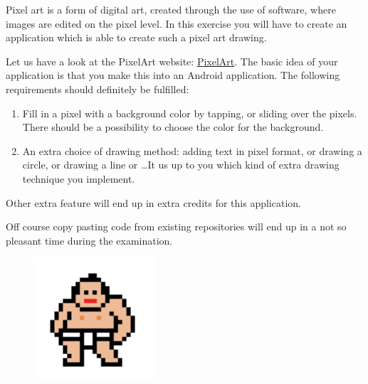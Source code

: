 \begin{exercise}
	Pixel art is a form of digital art, created through the use of software, where images are edited on the pixel level. In this exercise you will have to create an application which is able to create such a pixel art drawing. 
	
	Let us have a look at the PixelArt website: \href{https://www.pixilart.com/draw}{PixelArt}. The basic idea of your application is that you make this into an Android application. The following requirements should definitely be fulfilled:
	\begin{enumerate}
		\item Fill in a pixel with a background color by tapping, or sliding over the pixels. There should be a possibility to choose the color for the background.
		\item An extra choice of drawing method: adding text in pixel format, or drawing a circle, or drawing a line or \dots It us up to you which kind of extra drawing technique you implement.
	\end{enumerate}
	Other extra feature will end up in extra credits for this application. 
	
	Off course copy pasting code from existing repositories will end up in a not so pleasant time during the examination.
	

\end{exercise}
	\begin{figure}[b]
		\centering
	\includegraphics[width=0.4\textwidth]{images/ui/pixelart}
\end{figure}

